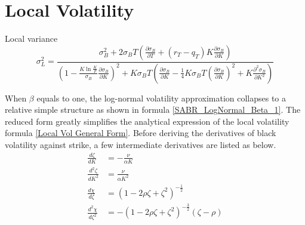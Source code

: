 \documentclass{article}
\begin{document}
\section{Local Volatility}

Local variance
\begin{equation} \label{Local Vol General Form}
    \sigma_{L}^2 = \frac{\sigma_{B}^2 + 2 \sigma_{B} T \left(\frac{\partial \sigma_{B}}{\partial T} + (r_T - q_T) K \frac{\partial \sigma_{B}}{\partial K}\right)}{\left(1 - \frac{K \ln{\frac{K}{F}}}{\sigma_{B}} \frac{\partial \sigma_{B}}{\partial K}\right)^2 + K \sigma_{B} T \left(\frac{\partial \sigma_{B}}{\partial K} - \frac{1}{4} K \sigma_{B} T \left(\frac{\partial \sigma_{B}}{\partial K}\right)^2 + K \frac{\partial^2 \sigma_{B}}{\partial K^2}\right)}
\end{equation}

When $ \beta $ equals to one, the log-normal volatility approximation collapses to a relative simple structure as shown in formula \ref{SABR_LogNormal_Beta_1}.
The reduced form greatly simplifies the analytical expression of the local volatility formula \ref{Local Vol General Form}.
Before deriving the derivatives of black volatility against strike, a few intermediate derivatives are listed as below.
\begin{subequations}
    \begin{align}
        \frac{d \zeta}{d K} &= -\frac{\nu}{\alpha K} \\
        \frac{d^2 \zeta}{d K^2} &= \frac{\nu}{\alpha K^2}\\
        \frac{d \chi}{d \zeta} &= \left(1 - 2 \rho \zeta + \zeta^2\right)^{-\frac{1}{2}}\\
        \frac{d^2 \chi}{d \zeta^2} &= -\left(1 - 2 \rho \zeta + \zeta^2\right)^{-\frac{3}{2}} \left(\zeta - \rho\right)
    \end{align}
\end{subequations}
\end{document}
